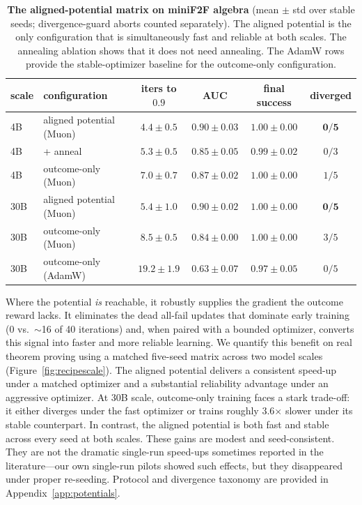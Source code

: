 \begin{table}[t]
\centering
\caption{\textbf{The aligned-potential matrix on miniF2F algebra} (mean $\pm$ std over stable seeds; divergence-guard aborts counted separately). The aligned potential is the only configuration that is simultaneously fast and reliable at both scales. The annealing ablation shows that it does not need annealing. The AdamW rows provide the stable-optimizer baseline for the outcome-only configuration.}
\label{tab:p0}
\small
\renewcommand{\arraystretch}{1.15}
\begin{tabular}{@{}llcccc@{}}
\toprule
scale & configuration & iters to $0.9$ & AUC & final success & diverged \\
\midrule
4B & aligned potential (Muon) & $\mathbf{4.4 \pm 0.5}$ & $\mathbf{0.90 \pm 0.03}$ & $1.00 \pm 0.00$ & $\mathbf{0/5}$ \\
4B & \quad + anneal & $5.3 \pm 0.5$ & $0.85 \pm 0.05$ & $0.99 \pm 0.02$ & $0/3$ \\
4B & outcome-only (Muon) & $7.0 \pm 0.7$ & $0.87 \pm 0.02$ & $1.00 \pm 0.00$ & $1/5$ \\
\midrule
30B & aligned potential (Muon) & $\mathbf{5.4 \pm 1.0}$ & $\mathbf{0.90 \pm 0.02}$ & $1.00 \pm 0.00$ & $\mathbf{0/5}$ \\
30B & outcome-only (Muon) & $8.5 \pm 0.5$ & $0.84 \pm 0.00$ & $1.00 \pm 0.00$ & $3/5$ \\
30B & outcome-only (AdamW) & $19.2 \pm 1.9$ & $0.63 \pm 0.07$ & $0.97 \pm 0.05$ & $0/5$ \\
\bottomrule
\end{tabular}
\end{table}

Where the potential \emph{is} reachable, it robustly supplies the gradient the outcome reward lacks. It eliminates the dead all-fail updates that dominate early training (0 vs.\ $\sim$16 of 40 iterations) and, when paired with a bounded optimizer, converts this signal into faster and more reliable learning. We quantify this benefit on real theorem proving using a matched five-seed matrix across two model scales (Figure~\ref{fig:recipescale}). The aligned potential delivers a consistent speed-up under a matched optimizer and a substantial reliability advantage under an aggressive optimizer. At 30B scale, outcome-only training faces a stark trade-off: it either diverges under the fast optimizer or trains roughly 3.6$\times$ slower under its stable counterpart. In contrast, the aligned potential is both fast and stable across every seed at both scales. These gains are modest and seed-consistent. They are not the dramatic single-run speed-ups sometimes reported in the literature---our own single-run pilots showed such effects, but they disappeared under proper re-seeding. Protocol and divergence taxonomy are provided in Appendix~\ref{app:potentials}.

